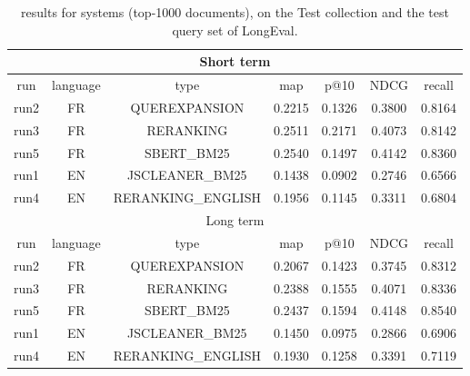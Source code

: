 \begin{table}[h!]
    \centering
    \begin{tabular}{ |c|c|c|c|c|c|c| }
        \hline
        \hline
        \multicolumn{7}{|c|}{Short term} \\ \hline
        run & language & type & map & p@10 & NDCG & recall \\ \hline
        run2 &   FR   & QUEREXPANSION & 0.2215 & 0.1326 & 0.3800 & 0.8164 \\ \hline
        run3 &   FR   & RERANKING & 0.2511 & 0.2171 & 0.4073 & 0.8142 \\ \hline
        run5 &   FR   & SBERT\_BM25 & 0.2540 & 0.1497 & 0.4142 & 0.8360 \\ \hline
        \hline
        run1 &   EN   & JSCLEANER\_BM25 & 0.1438 & 0.0902 & 0.2746 & 0.6566 \\ \hline
        run4 &   EN   & RERANKING\_ENGLISH & 0.1956 & 0.1145 & 0.3311 & 0.6804 \\ \hline
        \hline
        \hline
        \multicolumn{7}{|c|}{Long term} \\ \hline
        run  & language & type & map & p@10 & NDCG & recall \\ \hline
        run2 &   FR   & QUEREXPANSION & 0.2067 & 0.1423 & 0.3745 & 0.8312 \\ \hline
        run3 &   FR   & RERANKING & 0.2388 & 0.1555 & 0.4071 & 0.8336 \\ \hline
        run5 &   FR   & SBERT\_BM25 & 0.2437 & 0.1594 & 0.4148 & 0.8540 \\ \hline
        \hline
        run1 &   EN   & JSCLEANER\_BM25  & 0.1450 & 0.0975 & 0.2866 & 0.6906 \\ \hline
        run4 &   EN   & RERANKING\_ENGLISH & 0.1930 & 0.1258 & 0.3391 & 0.7119 \\ \hline
        \hline
    \end{tabular}
    \caption{results for systems (top-1000 documents), on the Test collection and the test query set of LongEval.}
    \label{tab:results_submission_test}
\end{table}
